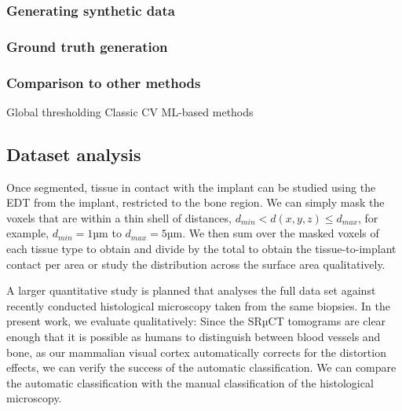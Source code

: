 \subsubsection{Generating synthetic data}
\subsubsection{Ground truth generation}
\subsubsection{Comparison to other methods}
Global thresholding
Classic CV
ML-based methods

\subsection{Dataset analysis}

Once segmented, tissue in contact with the implant can be studied using the EDT
from the implant, restricted to the bone region. We can simply mask the voxels
that are within a thin shell of distances, $d_{min} < d(x,y,z) \le d_{max}$,
for example, $d_{min} = 1 \text{µm}$ to $d_{max} = 5 \text{µm}$. We then sum
over the masked voxels of each tissue type to obtain and divide by the total to
obtain the tissue-to-implant contact per area or study the distribution across
the surface area qualitatively.

A larger quantitative study is planned that analyses the full data set against
recently conducted histological microscopy taken from the same biopsies. In the
present work, we evaluate qualitatively: Since the SRµCT tomograms are clear
enough that it is possible as humans to distinguish between blood vessels and
bone, as our mammalian visual cortex automatically corrects for the distortion
effects, we can verify the success of the automatic classification. We can
compare the automatic classification with the manual classification of the
histological microscopy.


